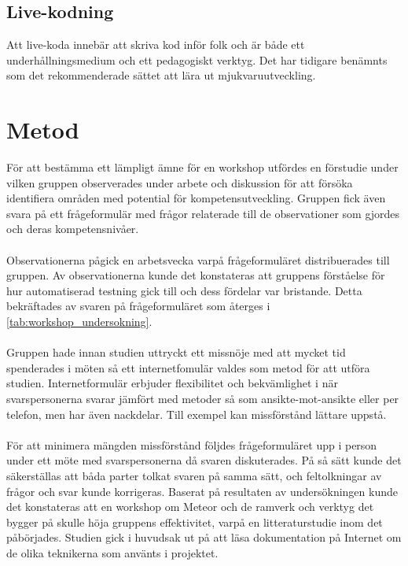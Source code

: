 \subsection{Live-kodning}
Att live-koda innebär att skriva kod inför folk och är både ett underhållningsmedium och ett
pedagogiskt verktyg. Det har tidigare benämnts som det rekommenderade sättet att lära ut
mjukvaruutveckling. \cite{computer_science_teaching}

\section{Metod}
\label{cha:seba-method}
För att bestämma ett lämpligt ämne för en workshop utfördes en förstudie under vilken gruppen
observerades under arbete och diskussion för att försöka identifiera områden med potential
för kompetensutveckling. Gruppen fick även svara på ett frågeformulär med frågor relaterade
till de observationer som gjordes och deras kompetensnivåer.
\\ \\
Observationerna pågick en arbetsvecka varpå frågeformuläret distribuerades till gruppen.
Av observationerna kunde det konstateras att gruppens förståelse för hur automatiserad testning
gick till och dess fördelar var bristande. Detta bekräftades av svaren på frågeformuläret
som återges i \ref{tab:workshop_undersokning}.
\\ \\
Gruppen hade innan studien uttryckt ett missnöje med att
mycket tid spenderades i möten så ett internetfomulär valdes som metod för
att utföra studien. Internetformulär erbjuder flexibilitet och bekvämlighet i
när svarspersonerna svarar jämfört med metoder så som ansikte-mot-ansikte eller per telefon,
men har även nackdelar. Till exempel kan missförstånd lättare uppstå. \cite{questionnaire_design}
\\ \\
För att minimera mängden missförstånd följdes frågeformuläret upp i person under
ett möte med svarspersonerna då svaren diskuterades. På så sätt kunde det säkerställas att båda
parter tolkat svaren på samma sätt, och feltolkningar av frågor och svar kunde korrigeras.
Baserat på resultaten av undersökningen kunde det konstateras att en
workshop om Meteor och de ramverk och verktyg det bygger på skulle höja gruppens effektivitet,
varpå en litteraturstudie inom det påbörjades. Studien gick i huvudsak ut på att läsa dokumentation
på Internet om de olika teknikerna som använts i projektet.
